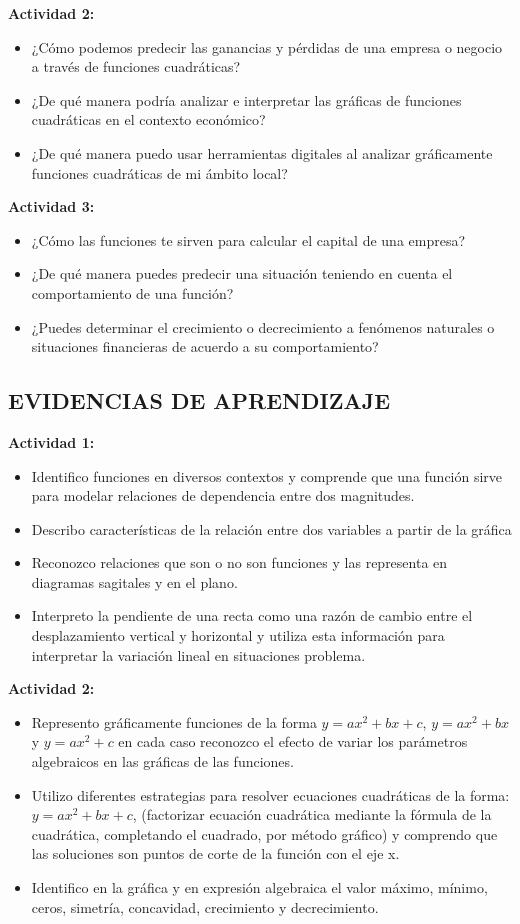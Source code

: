 \documentclass[12pt,a4paper]{article}
\begin{document}
\textbf{Actividad 2:}
\begin{itemize}
\item ¿Cómo podemos predecir las ganancias y pérdidas de una empresa o negocio a través de funciones cuadráticas?
\item ¿De qué manera podría analizar e interpretar las gráficas de funciones cuadráticas en el contexto económico?
\item ¿De qué manera puedo usar herramientas digitales al analizar gráficamente funciones cuadráticas de mi ámbito local?
\end{itemize}


\textbf{Actividad 3:}
\begin{itemize}
\item ¿Cómo las funciones te sirven para calcular el capital de una empresa?
\item ¿De qué manera puedes predecir una situación teniendo en cuenta el comportamiento de una función?
\item ¿Puedes determinar el crecimiento o decrecimiento a fenómenos naturales o situaciones financieras de acuerdo a su comportamiento?
\end{itemize}

\subsection*{EVIDENCIAS DE APRENDIZAJE}

\textbf{Actividad 1:}
\begin{itemize}
\item Identifico funciones en diversos contextos y comprende que una función sirve para modelar relaciones de dependencia entre dos magnitudes.
\item Describo características de la relación entre dos variables a partir de la gráfica
\item Reconozco relaciones que son o no son funciones y las representa en diagramas sagitales y en el plano.
\item Interpreto la pendiente de una recta como una razón de cambio entre el desplazamiento vertical y horizontal y utiliza esta información para interpretar la variación lineal en situaciones problema.
\end{itemize}

\textbf{Actividad 2:}
\begin{itemize}
\item Represento gráficamente funciones de la forma $y=ax^2+bx+c$, $y=ax^2+bx$ y $y=ax^2+c$ en cada caso reconozco el efecto de variar los parámetros algebraicos en las gráficas de las funciones.
\item Utilizo diferentes estrategias para resolver ecuaciones cuadráticas de la forma: $y=ax^2+bx+c$, (factorizar ecuación cuadrática mediante la fórmula de la cuadrática, completando el cuadrado, por método gráfico) y comprendo que las soluciones son puntos de corte de la función con el eje x.
\item Identifico en la gráfica y en expresión algebraica el valor máximo, mínimo, ceros, simetría, concavidad, crecimiento y decrecimiento.
\end{itemize}
\end{document}
